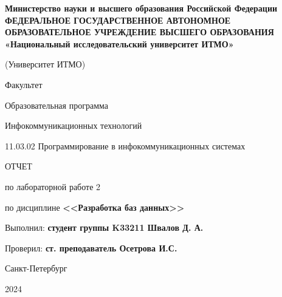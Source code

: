 \documentclass[a4paper, 14pt]{extarticle}
\begin{document}
\begin{titlepage}
  \vspace{0pt plus2fill}
  \noindent

  \vspace{0pt plus6fill}
  \begin{center}
    {
    \bfseries
    Министерство науки и высшего образования Российской Федерации
    {
    \scriptsize
    ФЕДЕРАЛЬНОЕ ГОСУДАРСТВЕННОЕ АВТОНОМНОЕ ОБРАЗОВАТЕЛЬНОЕ УЧРЕЖДЕНИЕ ВЫСШЕГО
    ОБРАЗОВАНИЯ
    }
    «Национальный исследовательский университет ИТМО»

    (Университет ИТМО)

    \begin{minipage}[t]{0.42\textwidth}
      \vspace*{0pt}
      \begin{flushright}
        Факультет

        Образовательная программа
      \end{flushright}
    \end{minipage}
    \begin{minipage}[t]{0.57\textwidth}
      \vspace*{0pt}
      \begin{flushright}
        Инфокоммуникационных технологий

        11.03.02 Программирование в инфокоммуникационных системах
      \end{flushright}
    \end{minipage}
    }

    \vspace{0pt plus5fill}

    \LARGE{
      ОТЧЕТ

      по лабораторной работе 2

      по дисциплине \textbf{<<Разработка баз данных>>}
    }
  \end{center}

  \vspace{0pt plus4fill}
  \begin{flushright}
    Выполнил: \textbf{студент группы K33211 Швалов Д. А.}

    Проверил: \textbf{ст. преподаватель Осетрова И.С.}
  \end{flushright}

  \vspace{0pt plus8fill}
  \begin{center}
    Санкт-Петербург

    2024
  \end{center}
\end{titlepage}
\end{document}
